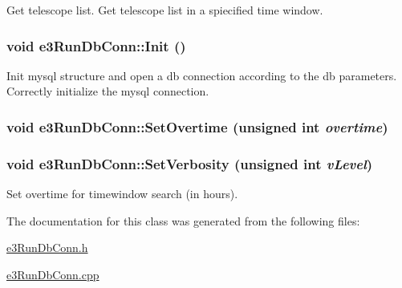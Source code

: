 Get telescope list. Get telescope list in a spiecified time window. \hypertarget{classe3RunDbConn_a1b4a0a5ec2ccd5deb5e042fa698ae872}{
\subsubsection[{Init}]{\setlength{\rightskip}{0pt plus 5cm}void e3RunDbConn::Init ()}}
\label{classe3RunDbConn_a1b4a0a5ec2ccd5deb5e042fa698ae872}


Init mysql structure and open a db connection according to the db parameters. Correctly initialize the mysql connection. \hypertarget{classe3RunDbConn_a671dda122e528e9d6022299fcbe0f9dd}{
\subsubsection[{SetOvertime}]{\setlength{\rightskip}{0pt plus 5cm}void e3RunDbConn::SetOvertime (unsigned int {\em overtime})}}
\label{classe3RunDbConn_a671dda122e528e9d6022299fcbe0f9dd}
\hypertarget{classe3RunDbConn_a1c96ff8447ad019cbd22957d55a70845}{
\subsubsection[{SetVerbosity}]{\setlength{\rightskip}{0pt plus 5cm}void e3RunDbConn::SetVerbosity (unsigned int {\em vLevel})}}
\label{classe3RunDbConn_a1c96ff8447ad019cbd22957d55a70845}


Set overtime for timewindow search (in hours). 

The documentation for this class was generated from the following files:\begin{DoxyCompactItemize}
\item 
\hyperlink{e3RunDbConn_8h}{e3RunDbConn.h}\item 
\hyperlink{e3RunDbConn_8cpp}{e3RunDbConn.cpp}\end{DoxyCompactItemize}
